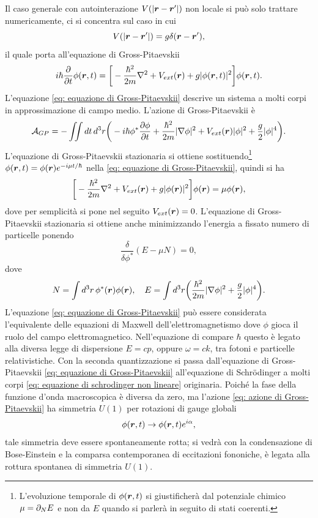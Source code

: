 Il caso generale con autointerazione $V(|\bm{r} - \bm{r}'|)$ non locale si può solo trattare numericamente, ci si concentra sul caso in cui
\begin{equation}
    V(|\bm{r} - \bm{r}'|) = g\delta(\bm{r} - \bm{r}'),
\end{equation}
il quale porta all'equazione di Gross-Pitaevskii
\begin{equation}
\label{eq: equazione di Gross-Pitaevskii}
    i\hbar\frac{\partial}{\partial t}\phi(\bm{r},t) = \bigg[-\frac{\hbar^2}{2m}\nabla^2 + V_{ext}(\bm{r}) + g|\phi(\bm{r},t)|^2\bigg]\phi(\bm{r},t).
\end{equation}
L'equazione \eqref{eq: equazione di Gross-Pitaevskii} descrive un sistema a molti corpi in approssimazione di campo medio. L'azione di Gross-Pitaevskii è
\begin{equation}
\label{eq: azione di Gross-Pitaevskii}
    \mathcal{A}_{GP} = -\iint dt\,d^3r \bigg(-i\hbar\phi^*\frac{\partial\phi}{\partial t} + \frac{\hbar^2}{2m}|\nabla\phi|^2 + V_{ext}(\bm{r})|\phi|^2 + \frac{g}{2}|\phi|^4\bigg).
\end{equation}
L'equazione di Gross-Pitaevskii stazionaria si ottiene sostituendo\footnote{L'evoluzione temporale di $\phi(\bm{r},t)$ si giustificherà dal potenziale chimico $\mu = \partial_NE$ e non da $E$ quando si parlerà in seguito di stati coerenti.} $\phi(\bm{r},t) = \phi(\bm{r})e^{-i\mu t/\hbar}$ nella \eqref{eq: equazione di Gross-Pitaevskii}, quindi si ha
\begin{equation}
    \bigg[-\frac{\hbar^2}{2m}\nabla^2 + V_{ext}(\bm{r}) + g|\phi(\bm{r})|^2\bigg]\phi(\bm{r}) = \mu\phi(\bm{r}),
\end{equation}
dove per semplicità si pone nel seguito $V_{ext}(\bm{r}) = 0$. L'equazione di Gross-Pitaevskii stazionaria si ottiene anche minimizzando l'energia a fissato numero di particelle ponendo
\begin{equation}
    \frac{\delta}{\delta\phi^*}(E - \mu N) = 0,
\end{equation}
dove 
\begin{equation}
    N = \int d^3r\,\phi^*(\bm{r})\phi(\bm{r}),\quad E = \int d^3r\bigg(\frac{\hbar^2}{2m}|\nabla\phi|^2 + \frac{g}{2}|\phi|^4\bigg).
\end{equation}
L'equazione \eqref{eq: equazione di Gross-Pitaevskii} può essere considerata l'equivalente delle equazioni di Maxwell dell'elettromagnetismo dove $\phi$ gioca il ruolo del campo elettromagnetico. Nell'equazione di compare $\hbar$ questo è legato alla diversa legge di dispersione $E = cp$, oppure $\omega = ck$, tra fotoni e particelle relativistiche. Con la seconda quantizzazione si passa dall'equazione di Gross-Pitaevskii \eqref{eq: equazione di Gross-Pitaevskii} all'equazione di Schr\"odinger a molti corpi \eqref{eq: equazione di schrodinger non lineare} originaria. Poiché la fase della funzione d'onda macroscopica è diversa da zero, ma l'azione \eqref{eq: azione di Gross-Pitaevskii} ha simmetria $U(1)$ per rotazioni di gauge globali 
\begin{equation}
    \phi(\bm{r},t) \to \phi(\bm{r},t)e^{i\alpha},
\end{equation}
tale simmetria deve essere spontaneamente rotta; si vedrà con la condensazione di Bose-Einstein e la comparsa contemporanea di eccitazioni fononiche, è legata alla rottura spontanea di simmetria $U(1)$. 

